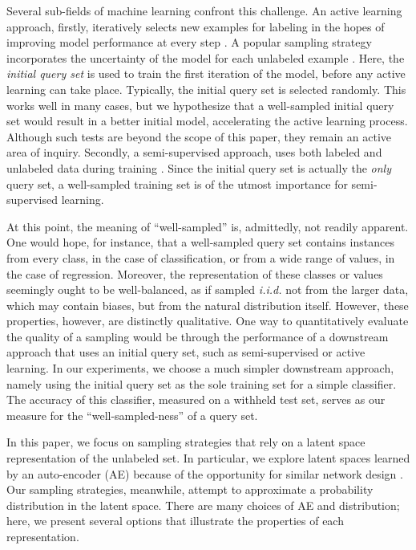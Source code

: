 \documentclass[a4paper]{article}
\begin{document}
Several sub-fields of machine learning confront this challenge. An active
learning approach, firstly, iteratively selects new examples for labeling in the
hopes of improving model performance at every step \cite{settles_active_2012}. A
popular sampling strategy incorporates the uncertainty of the model for each
unlabeled example \cite{settles_active_2012, lewis_sequential_1994}. Here, the
\emph{initial query set} is used to train the first iteration of the model,
before any active learning can take place. Typically, the initial query set is
selected randomly. This works well in many cases, but we hypothesize that a
well-sampled initial query set would result in a better initial model,
accelerating the active learning process. Although such tests are beyond the
scope of this paper, they remain an active area of inquiry. Secondly, a
semi-supervised approach, uses both labeled and unlabeled data during training
\cite{zhu_semi-supervised_2005}. Since the initial query set is actually the
\emph{only} query set, a well-sampled training set is of the utmost importance
for semi-supervised learning.

At this point, the meaning of ``well-sampled'' is, admittedly, not readily
apparent. One would hope, for instance, that a well-sampled query set contains
instances from every class, in the case of classification, or from a wide range
of values, in the case of regression. Moreover, the representation of these
classes or values seemingly ought to be well-balanced, as if sampled
\emph{i.i.d.} not from the larger data, which may contain biases, but from the
natural distribution itself. However, these properties, however, are distinctly
qualitative. One way to quantitatively evaluate the quality of a sampling would
be through the performance of a downstream approach that uses an initial query
set, such as semi-supervised or active learning. In our experiments, we choose a
much simpler downstream approach, namely using the initial query set as the sole
training set for a simple classifier. The accuracy of this classifier, measured
on a withheld test set, serves as our measure for the ``well-sampled-ness'' of a
query set.

In this paper, we focus on sampling strategies that rely on a latent space
representation of the unlabeled set. In particular, we explore latent spaces
learned by an auto-encoder (AE) because of the opportunity for similar network
design \cite{goodfellow_deep_nodate}. Our sampling strategies, meanwhile,
attempt to approximate a probability distribution in the latent space. There are
many choices of AE and distribution; here, we present several options that
illustrate the properties of each representation.
\end{document}
